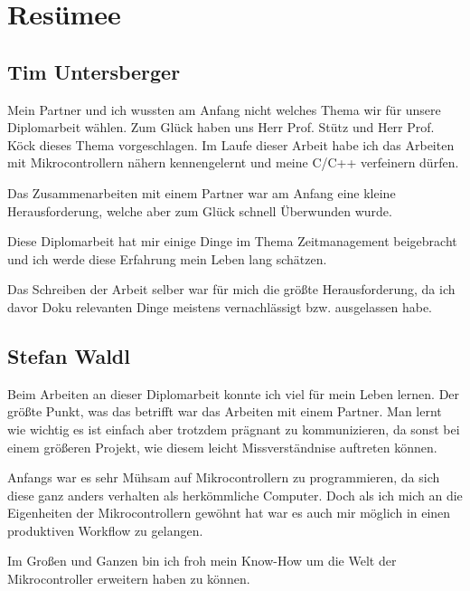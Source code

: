 \chapter{Resümee}

\section{Tim Untersberger}

Mein Partner und ich wussten am Anfang nicht welches Thema wir für unsere Diplomarbeit wählen. Zum Glück haben uns Herr Prof. Stütz und Herr Prof. Köck dieses Thema vorgeschlagen. Im Laufe dieser Arbeit habe ich das Arbeiten mit Mikrocontrollern nähern kennengelernt und meine C/C++ verfeinern dürfen. 

Das Zusammenarbeiten mit einem Partner war am Anfang eine kleine Herausforderung, welche aber zum Glück schnell Überwunden wurde.

Diese Diplomarbeit hat mir einige Dinge im Thema Zeitmanagement beigebracht und ich werde diese Erfahrung mein Leben lang schätzen.

Das Schreiben der Arbeit selber war für mich die größte Herausforderung, da ich davor Doku relevanten Dinge meistens vernachlässigt bzw. ausgelassen habe.

\section{Stefan Waldl}
Beim Arbeiten an dieser Diplomarbeit konnte ich viel für mein Leben lernen. Der größte Punkt, was das betrifft war das Arbeiten mit einem Partner. Man lernt wie wichtig es ist einfach aber trotzdem prägnant zu kommunizieren, da sonst bei einem größeren Projekt, wie diesem leicht Missverständnise auftreten können.

Anfangs war es sehr Mühsam auf Mikrocontrollern zu programmieren, da sich diese ganz anders verhalten als herkömmliche Computer. Doch als ich mich an die Eigenheiten der Mikrocontrollern gewöhnt hat war es auch mir möglich in einen produktiven Workflow zu gelangen.

Im Großen und Ganzen bin ich froh mein Know-How um die Welt der Mikrocontroller erweitern haben zu können.